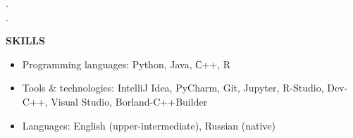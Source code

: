 \documentclass{article}
\begin{document}
.\\[10pt]


{\centering \noindent\makebox[\textwidth/2]{\rule{\paperwidth}{0.2pt}}}
.\\[10pt]


\begin{minipage}{0.3\textwidth}
  \begin{flushleft}
	\Large {\bf SKILLS}
  \end{flushleft}
\end{minipage}
\begin{minipage}{0.7\textwidth}
  \begin{flushleft}
    \begin{itemize}
        \item {\br Programming languages:} Python, Java, С++, R
        \item {\br Tools & technologies:} IntelliJ Idea, PyCharm, Git, Jupyter, R-Studio, Dev-C++, Visual Studio, Borland-C++Builder
        \item {\br Languages}: English (upper-intermediate), Russian (native)
\end{itemize}
  \end{flushleft}
\end{minipage}
\end{document}
